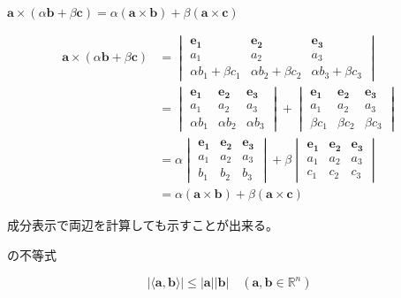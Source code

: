 \documentclass[12pt,b5paper]{ltjsarticle}
\begin{document}
$\bm{a}\times (\alpha\bm{b}+\beta\bm{c})
 = \alpha(\bm{a}\times \bm{b})
 + \beta(\bm{a}\times \bm{c})$

\begin{align}
 \bm{a}\times (\alpha\bm{b}+\beta\bm{c})
 &= \begin{vmatrix}
    \bm{e_1} & \bm{e_2} & \bm{e_3}\\
    a_1 & a_2 & a_3\\
    \alpha b_1 + \beta c_1 & \alpha b_2 + \beta c_2 & \alpha b_3 + \beta c_3
   \end{vmatrix}\\
 &= \begin{vmatrix}
    \bm{e_1} & \bm{e_2} & \bm{e_3}\\
    a_1 & a_2 & a_3\\
    \alpha b_1 & \alpha b_2 & \alpha b_3
   \end{vmatrix}
 + \begin{vmatrix}
    \bm{e_1} & \bm{e_2} & \bm{e_3}\\
    a_1 & a_2 & a_3\\
    \beta c_1 & \beta c_2 & \beta c_3
   \end{vmatrix}\\
 &= \alpha
   \begin{vmatrix}
    \bm{e_1} & \bm{e_2} & \bm{e_3}\\
    a_1 & a_2 & a_3\\
    b_1 & b_2 & b_3
   \end{vmatrix}
 + \beta
   \begin{vmatrix}
    \bm{e_1} & \bm{e_2} & \bm{e_3}\\
    a_1 & a_2 & a_3\\
    c_1 & c_2 & c_3
   \end{vmatrix}\\
 &=\alpha(\bm{a}\times \bm{b}) + \beta(\bm{a}\times \bm{c})
\end{align}

成分表示で両辺を計算しても示すことが出来る。


\newpage


\hrulefill

の不等式

\begin{equation}
 \lvert \langle \bm{a}, \bm{b} \rangle \rvert
  \leq
 \lvert \bm{a} \rvert \lvert \bm{b} \rvert
\quad (\bm{a},\bm{b}\in\mathbb{R}^n)
\end{equation}

\hrulefill
\end{document}
